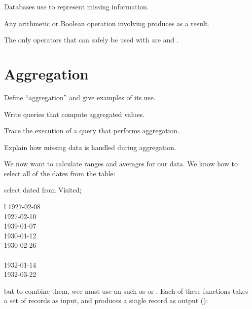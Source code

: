 \begin{keypoints}
\begin{swcitemize}
\item
  Databases use  to represent missing information.
\item
  Any arithmetic or Boolean operation involving  produces
   as a result.
\item
  The only operators that can safely be used with  are
   and .
\end{swcitemize}
\end{keypoints}

\section{Aggregation}

\begin{objectives}
\begin{swcitemize}
\item
  Define ``aggregation'' and give examples of its use.
\item
  Write queries that compute aggregated values.
\item
  Trace the execution of a query that performs aggregation.
\item
  Explain how missing data is handled during aggregation.
\end{swcitemize}
\end{objectives}

We now want to calculate ranges and averages for our data. We know how
to select all of the dates from the  table:

\begin{VerbIn}
select dated from Visited;
\end{VerbIn}

\begin{sqltable}{l}
1927-02-08 \\
1927-02-10 \\
1939-01-07 \\
1930-01-12 \\
1930-02-26 \\
~ \\
1932-01-14 \\
1932-03-22 \\
\end{sqltable}

but to combine them, wee must use an
 such as
 or . Each of these functions takes a set of
records as input, and produces a single record as output
():

